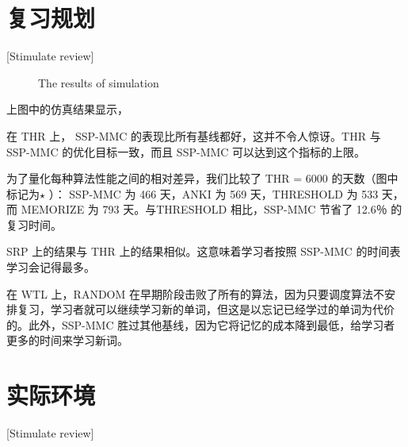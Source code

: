 \section{复习规划}[Stimulate review]

\begin{figure}[htbp]
    \begin{minipage}{\textwidth}
    \centering
    \subfigure{\label{fig:thr}}\addtocounter{subfigure}{-2}
    \hspace{2em}
    \subfigure{\label{fig:srp}}\addtocounter{subfigure}{-2}
    \end{minipage}
    \centering
    \begin{minipage}{\textwidth}
    \centering
    \subfigure{\label{fig:wtl}}\addtocounter{subfigure}{-2}
    \hspace{2em}
    \subfigure{\label{fig:new}}\addtocounter{subfigure}{-2}
    \end{minipage}
    \vspace{0.2em}
    \caption{The results of simulation}
    \label{fig:simulation}
  \end{figure}

上图中的仿真结果显示，

在 THR 上， SSP-MMC 的表现比所有基线都好，这并不令人惊讶。THR 与 SSP-MMC 的优化目标一致，而且 SSP-MMC 可以达到这个指标的上限。

为了量化每种算法性能之间的相对差异，我们比较了 THR  = 6000 的天数（图中标记为$\star$ ）： SSP-MMC 为 466 天，ANKI 为 569 天，THRESHOLD 为 533 天，而 MEMORIZE 为 793 天。与THRESHOLD 相比，SSP-MMC 节省了 12.6％ 的复习时间。

SRP 上的结果与 THR 上的结果相似。这意味着学习者按照 SSP-MMC 的时间表学习会记得最多。

在 WTL 上，RANDOM 在早期阶段击败了所有的算法，因为只要调度算法不安排复习，学习者就可以继续学习新的单词，但这是以忘记已经学过的单词为代价的。此外，SSP-MMC 胜过其他基线，因为它将记忆的成本降到最低，给学习者更多的时间来学习新词。

\section{实际环境}[Stimulate review]


